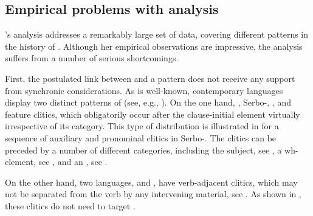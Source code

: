 \documentclass[output=paper,modfonts,newtxmath,hidelinks]{langscibook}
\begin{document}
\subsection{Empirical problems with  analysis}\label{11:s2.2}

\citeauthor{pancheva2005}’s analysis addresses a remarkably large set of data, covering different  patterns in the history of . Although her empirical observations are impressive, the analysis suffers from a number of serious shortcomings. 

First, the postulated link between  and a  pattern does not receive any support from synchronic considerations. As is well-known, contemporary  languages display two distinct patterns of  (see, e.g., \citealt{Franks-King2000}). On the one hand, , Serbo-, , and  feature  clitics, which obligatorily occur after the clause-initial element virtually irrespective of its category. This type of  distribution is illustrated in  for a sequence of auxiliary and pronominal clitics in Serbo-. The clitics can be preceded by a number of different categories, including the subject, see , a wh-element, see , and an , see . 

\ea \label{11:ex6}
	 \label{11:ex6a}
    \label{11:ex6b}
    \label{11:ex6c}
	\z
\z
On the other hand, two  languages,  and , have verb-adjacent clitics, which may not be separated from the verb by any intervening material, see . As shown in , these clitics do not need to target . 
\end{document}
